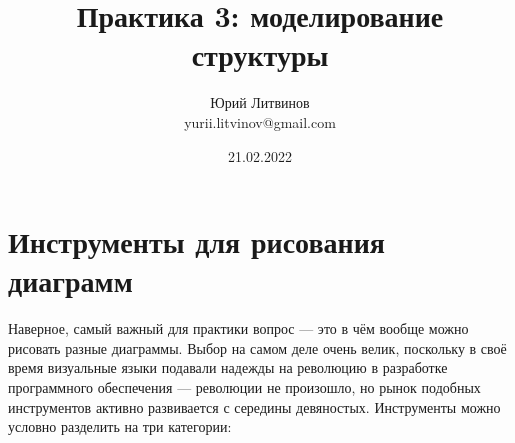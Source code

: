 \documentclass[a5paper]{article}
\title{Практика 3: моделирование структуры}
\author{Юрий Литвинов\\\small{yurii.litvinov@gmail.com}}
\date{21.02.2022}
\begin{document}
\maketitle
\thispagestyle{empty}

\section{Инструменты для рисования диаграмм}

Наверное, самый важный для практики вопрос --- это в чём вообще можно рисовать разные диаграммы. Выбор на самом деле очень велик, поскольку в своё время визуальные языки подавали надежды на революцию в разработке программного обеспечения --- революции не произошло, но рынок подобных инструментов активно развивается с середины девяностых. Инструменты можно условно разделить на три категории:
\end{document}
